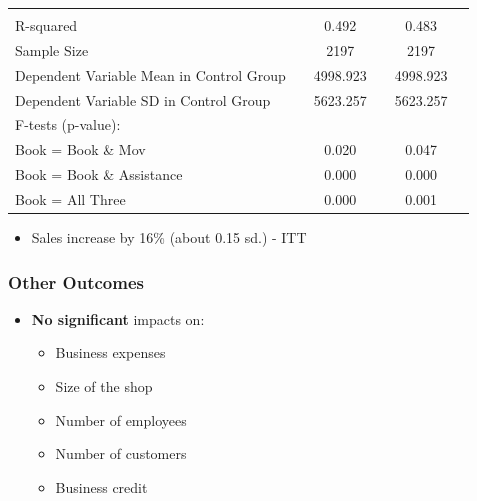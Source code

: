 \documentclass[10pt]{beamer}
\begin{document}
\begin{frame}
{{\begin{table}[t]
\begin{tabular}{l*{5}{c}}
   	\\
\hline         							
\\
R-squared											  	&& 0.492  	&&  0.483	\\
Sample Size 											&& 2197	&& 2197 	\\
Dependent Variable Mean in Control Group			 	&&         4998.923   &&	          4998.923 	\\
Dependent Variable SD in Control Group				 	&&         5623.257   	&&           5623.257	\\
F-tests (p-value):											&&			&&			\\
\hspace{5mm}Book = Book \& Mov				        	&&            0.020 	&&           0.047 	\\
\hspace{5mm}Book = Book \& Assistance				  			&&0.000   	&& 0.000 	\\
\hspace{5mm}Book = All Three			   			  	&&0.000   	&&0.001  	\\
\hline
	\end{tabular}

\end{table}}}
\begin{itemize}
\item Sales increase by 16\% (about 0.15 sd.) - ITT %
\end{itemize}
\end{frame}


\begin{frame}
\frametitle{Other Outcomes}
\begin{itemize}
\item \textbf{No significant} impacts on:
    \begin{itemize}
    \vspace{0.2in}
    \item Business expenses
    \vspace{0.2in} 		
    \item Size of the shop
      \vspace{0.2in}
    \item Number of employees
      \vspace{0.2in}
    \item Number of customers
       \vspace{0.2in}
     \item Business credit
    \end{itemize}
\end{itemize}
\end{frame}
\end{document}
